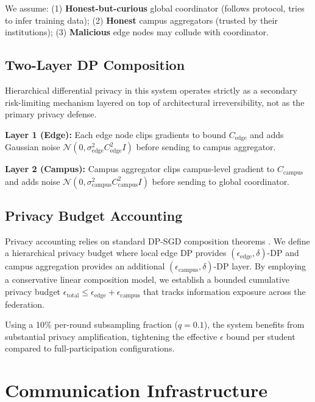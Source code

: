 \documentclass[conference]{IEEEtran}
\begin{document}
We assume: (1) \textbf{Honest-but-curious} global coordinator (follows protocol, tries to infer training data); (2) \textbf{Honest} campus aggregators (trusted by their institutions); (3) \textbf{Malicious} edge nodes may collude with coordinator.

\subsection{Two-Layer DP Composition}

Hierarchical differential privacy in this system operates strictly as a secondary risk-limiting mechanism layered on top of architectural irreversibility, not as the primary privacy defense.

\textbf{Layer 1 (Edge):} Each edge node clips gradients to bound $C_{\text{edge}}$ and adds Gaussian noise $\mathcal{N}(0, \sigma_{\text{edge}}^2 C_{\text{edge}}^2 I)$ before sending to campus aggregator.

\textbf{Layer 2 (Campus):} Campus aggregator clips campus-level gradient to $C_{\text{campus}}$ and adds noise $\mathcal{N}(0, \sigma_{\text{campus}}^2 C_{\text{campus}}^2 I)$ before sending to global coordinator.

\subsection{Privacy Budget Accounting}

Privacy accounting relies on standard DP-SGD composition theorems \cite{abadi2016deep}. We define a hierarchical privacy budget where local edge DP provides $(\epsilon_{\text{edge}}, \delta)$-DP and campus aggregation provides an additional $(\epsilon_{\text{campus}}, \delta)$-DP layer. By employing a conservative linear composition model, we establish a bounded cumulative privacy budget $\epsilon_{\text{total}} \leq \epsilon_{\text{edge}} + \epsilon_{\text{campus}}$ that tracks information exposure across the federation.

Using a 10\% per-round subsampling fraction ($q = 0.1$), the system benefits from substantial privacy amplification, tightening the effective $\epsilon$ bound per student compared to full-participation configurations.

\section{Communication Infrastructure}
\end{document}
